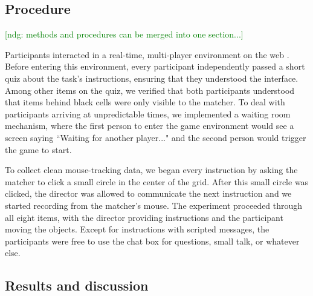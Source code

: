 \documentclass[10pt,letterpaper]{article}
\newcommand{\ndg}[1]{\textcolor{Green}{[ndg: #1]}}
\begin{document}
\subsection{Procedure}

\ndg{methods and procedures can be merged into one section...}

Participants interacted in a real-time, multi-player environment on the web \cite{Hawkins15_RealTimeWebExperiments}. Before entering this environment, every participant independently passed a short quiz about the task's instructions, ensuring that they understood the interface. Among other items on the quiz, we verified that both participants understood that items behind black cells were only visible to the matcher. To deal with participants arriving at unpredictable times, we implemented a waiting room mechanism, where the first person to enter the game environment would see a screen saying ``Waiting for another player..." and the second person would trigger the game to start. 

To collect clean mouse-tracking data, we began every instruction by asking the matcher to click a small circle in the center of the grid. After this small circle was clicked, the director was allowed to communicate the next instruction and we started recording from the matcher's mouse. The experiment proceeded through all eight items, with the director providing instructions and the participant moving the objects. Except for instructions with scripted messages, the participants were free to use the chat box for questions, small talk, or whatever else.

\subsection{Results and discussion}
\end{document}
